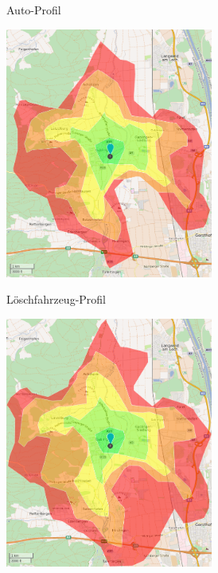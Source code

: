 \begin{figure}[htb]
\begin{subfigure}{0.49\textwidth}
\caption{Auto-Profil}
\label{fig:isocar}
\end{subfigure}
\begin{subfigure}{0.49\textwidth}
\centering
\includegraphics[width = 0.75\textwidth]{../media/isofire.png} \\
\caption{Löschfahrzeug-Profil}
\label{fig:isofire}
\end{subfigure}
\begin{subfigure}{0.49\textwidth}
\centering
\includegraphics[width = 0.75\textwidth]{../media/isoeme.png} \\

\end{subfigure}
\end{figure}
